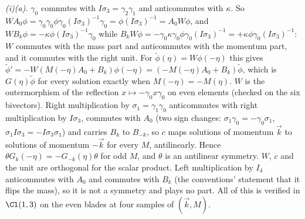 \emph{(i)(a).} $\gamma_{0}$ commutes with $I\sigma_{3} = \gamma_{2}\gamma_{1}$ and anticommutes with $\kappa$. So $WA_{0}\phi = \gamma_{0}\gamma_{0}\phi\gamma_{0}(I\sigma_{3})^{-1}\gamma_{0} = \phi(I\sigma_{3})^{-1} = A_{0}W\phi$, and $WB_{k}\phi = -\kappa\phi(I\sigma_{3})^{-1}\gamma_{0}$ while $B_{k}W\phi = -\gamma_{0}\kappa\gamma_{0}\phi\gamma_{0}(I\sigma_{3})^{-1} = +\kappa\phi\gamma_{0}(I\sigma_{3})^{-1}$: $W$ commutes with the mass part and anticommutes with the momentum part, and it commutes with the right unit. For $\tilde\phi(\eta) = W\phi(-\eta)$ this gives $\tilde\phi' = -W(M(-\eta)A_{0} + B_{k})\phi(-\eta) = (-M(-\eta)A_{0} + B_{k})\tilde\phi$, which is $G(\eta)\tilde\phi$ for every solution exactly when $M(-\eta) = -M(\eta)$. $W$ is the outermorphism of the reflection $x \mapsto -\gamma_{0}x\gamma_{0}$ on even elements (checked on the six bivectors). Right multiplication by $\sigma_{1} = \gamma_{1}\gamma_{0}$ anticommutes with right multiplication by $I\sigma_{3}$, commutes with $A_{0}$ (two sign changes: $\sigma_{1}\gamma_{0} = -\gamma_{0}\sigma_{1}$, $\sigma_{1}I\sigma_{3} = -I\sigma_{3}\sigma_{1}$) and carries $B_{k}$ to $B_{-k}$, so $c$ maps solutions of momentum $\vec k$ to solutions of momentum $-\vec k$ for every $M$, antilinearly. Hence $\theta G_{k}(-\eta) = -G_{-k}(\eta)\theta$ for odd $M$, and $\theta$ is an antilinear symmetry. $W$, $c$ and the unit are orthogonal for the scalar product. Left multiplication by $I_{4}$ anticommutes with $A_{0}$ and commutes with $B_{k}$ (the conventions' statement that it flips the mass), so it is not a symmetry and plays no part. All of this is verified in $\Cl(1,3)$ on the even blades at four samples of $(\vec k, M)$.

